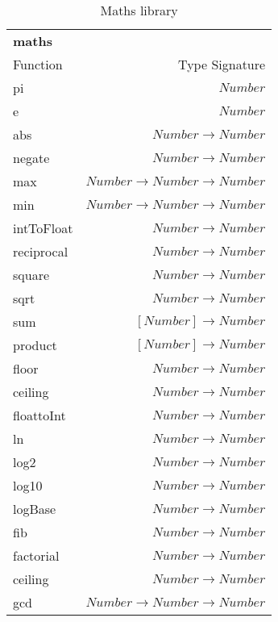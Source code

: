 \begin{table}
    \begin{tabular}{l r}
    \rowcolor{light-gray}
        \textbf{maths} & \\
        Function & Type Signature \\
        \hline
        pi & $Number$ \\
        e & $Number$ \\
        abs & $Number \rightarrow Number$ \\
        negate & $Number \rightarrow Number$ \\
        max & $Number \rightarrow Number \rightarrow Number$ \\
        min & $Number \rightarrow Number \rightarrow Number$ \\
        intToFloat & $Number \rightarrow Number$ \\
        reciprocal & $Number \rightarrow Number$ \\
        square & $Number \rightarrow Number$ \\
        sqrt & $Number \rightarrow Number$ \\
        sum & $[Number] \rightarrow Number$ \\
        product & $[Number] \rightarrow Number$ \\
        floor & $Number \rightarrow Number$ \\
        ceiling & $Number \rightarrow Number$ \\
        floattoInt & $Number \rightarrow Number$ \\
        ln & $Number \rightarrow Number$ \\
        log2 & $Number \rightarrow Number$ \\
        log10 & $Number \rightarrow Number$ \\
        logBase & $Number \rightarrow Number$ \\
        fib & $Number \rightarrow Number$ \\
        factorial & $Number \rightarrow Number$ \\
        ceiling & $Number \rightarrow Number$ \\
        gcd & $Number \rightarrow Number \rightarrow Number$ \\
    \end{tabular}
    \caption{Maths library}
\label{table:maths}
\end{table}

